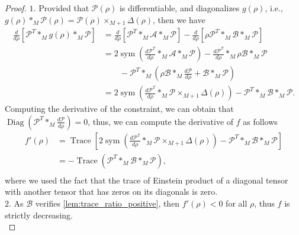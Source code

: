 \documentclass{siamltex}
\begin{document}
\begin{proof}
$1.$ Provided that $\mathcal{P}(\rho)$ is differentiable, and diagonalizes $g(\rho)$, i.e., $g(\rho) *_M \mathcal{P}(\rho)=\mathcal{P}(\rho) \times_{M+1} \Delta(\rho)$, then we have
\begin{equation*}
\begin{aligned}
\frac{d}{d \rho} \left[ \mathcal{P}^T *_M g(\rho) *_M \mathcal{P} \right] &= \frac{d }{d \rho} \left[ \mathcal{P}^T *_M \mathcal{A} *_M \mathcal{P}\right] - \frac{d }{d \rho} \left[\rho \mathcal{P}^T *_M \mathcal{B} *_M \mathcal{P} \right]\\
&=2 \operatorname{sym} \left(\frac{d \mathcal{P}^T}{d \rho} *_M \mathcal{A}*_M \mathcal{P}\right) - \frac{d \mathcal{P}^T}{d \rho} *_M \rho \mathcal{B} *_M \mathcal{P}\\
&\quad \quad - \mathcal{P}^T *_M \left( \rho \mathcal{B} *_M \frac{d \mathcal{P}}{d \rho} + \mathcal{B} *_M \mathcal{P} \right)\\
&= 2 \operatorname{sym} \left(\frac{d \mathcal{P}^T}{d \rho} *_M \mathcal{P} \times_{M+1} \Delta(\rho)\right) - \mathcal{P}^T *_M \mathcal{B} *_M \mathcal{P}.
\end{aligned}
\end{equation*}
Computing the derivative of the constraint, we can obtain that $\operatorname{Diag}(\mathcal{P}^T *_M \frac{d\mathcal{P}}{d \rho})=0$, thus, we can compute the derivative of $f$ as follows
\begin{equation*}
\begin{aligned}
f'(\rho) &= \operatorname{Trace}\left[2 \operatorname{sym} \left(\frac{d \mathcal{P}^T}{d \rho} *_M \mathcal{P} \times_{M+1} \Delta(\rho)\right) - \mathcal{P}^T *_M \mathcal{B} *_M \mathcal{P} \right]\\
&= - \operatorname{Trace}(\mathcal{P}^T *_M \mathcal{B} *_M \mathcal{P}),\\
\end{aligned}
\end{equation*}
where we used the fact that the trace of Einstein product of a diagonal tensor with another tensor that has zeros on its diagonals is zero.\\
$2.$ As $\mathcal{B}$ verifies \ref{lem:trace_ratio_positive}, then $f'(\rho) < 0$ for all $\rho$, thus $f$ is strictly decreasing.\\

\end{proof}
\end{document}
